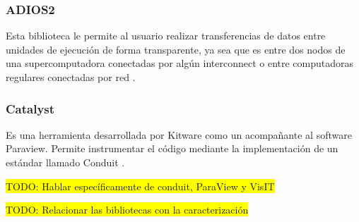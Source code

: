 \subsubsection{ADIOS2}
Esta biblioteca le permite al usuario realizar transferencias de datos entre unidades de ejecución de forma transparente, ya sea que es entre dos nodos de una supercomputadora conectadas por algún interconnect o entre computadoras regulares conectadas por red \cite{Godoy2020}.
\subsubsection{Catalyst}
Es una herramienta desarrollada por Kitware como un acompañante al software Paraview. Permite instrumentar el código mediante la implementación de un estándar llamado Conduit \cite{Ayachit2021}.


\colorbox{yellow}{TODO: Hablar específicamente de conduit, ParaView y VisIT}

\colorbox{yellow}{TODO: Relacionar las bibliotecas con la caracterización}
